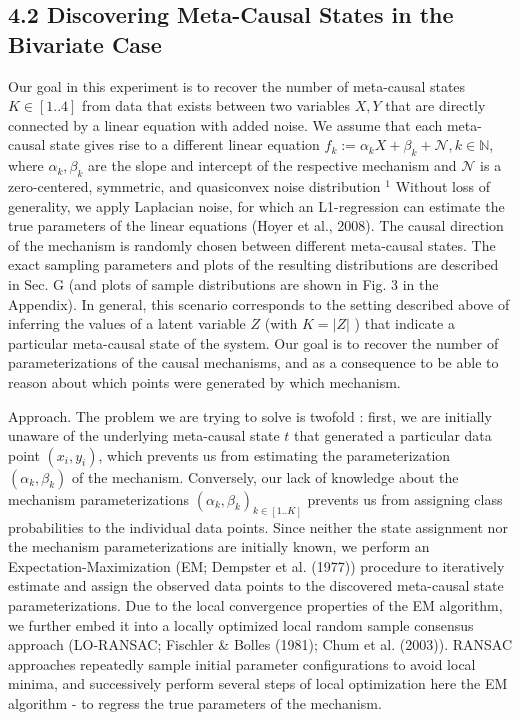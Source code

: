 \documentclass[10pt]{article}
\begin{document}
\subsection*{4.2 Discovering Meta-Causal States in the Bivariate Case}
Our goal in this experiment is to recover the number of meta-causal states $K \in[1 . .4]$ from data that exists between two variables $X, Y$ that are directly connected by a linear equation with added noise. We assume that each meta-causal state gives rise to a different linear equation $f_{k}:=\alpha_{k} X+ \beta_{k}+\mathcal{N}, k \in \mathbb{N}$, where $\alpha_{k}, \beta_{k}$ are the slope and intercept of the respective mechanism and $\mathcal{N}$ is a zero-centered, symmetric, and quasiconvex noise distribution ${ }^{1}$ Without loss of generality, we apply Laplacian noise, for which an L1-regression can estimate the true parameters of the linear equations (Hoyer et al., 2008). The causal direction of the mechanism is randomly chosen between different meta-causal states. The exact sampling parameters and plots of the resulting distributions are described in Sec. G (and plots of sample distributions are shown in Fig. 3 in the Appendix). In general, this scenario corresponds to the setting described above of inferring the values of a latent variable $Z$ (with $K=|Z|$ ) that indicate a particular meta-causal state of the system. Our goal is to recover the number of parameterizations of the causal mechanisms, and as a consequence to be able to reason about which points were generated by which mechanism.

Approach. The problem we are trying to solve is twofold : first, we are initially unaware of the underlying meta-causal state $t$ that generated a particular data point $\left(x_{i}, y_{i}\right)$, which prevents us from estimating the parameterization $\left(\alpha_{k}, \beta_{k}\right)$ of the mechanism. Conversely, our lack of knowledge about the mechanism parameterizations $\left(\alpha_{k}, \beta_{k}\right)_{k \in[1 . . K]}$ prevents us from assigning class probabilities to the individual data points. Since neither the state assignment nor the mechanism parameterizations are initially known, we perform an Expectation-Maximization (EM; Dempster et al. (1977)) procedure to iteratively estimate and assign the observed data points to the discovered meta-causal state parameterizations. Due to the local convergence properties of the EM algorithm, we further embed it into a locally optimized local random sample consensus approach (LO-RANSAC; Fischler \& Bolles (1981); Chum et al. (2003)). RANSAC approaches repeatedly sample initial parameter configurations to avoid local minima, and successively perform several steps of local optimization here the EM algorithm - to regress the true parameters of the mechanism.
\end{document}
